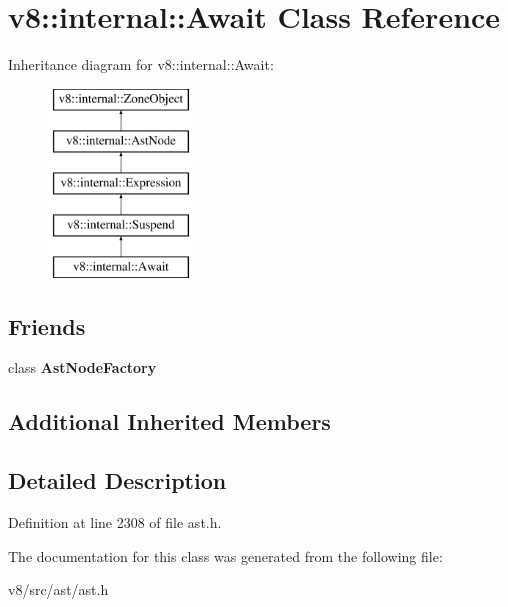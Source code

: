 \hypertarget{classv8_1_1internal_1_1Await}{}\section{v8\+:\+:internal\+:\+:Await Class Reference}
\label{classv8_1_1internal_1_1Await}
Inheritance diagram for v8\+:\+:internal\+:\+:Await\+:\begin{figure}[H]
\begin{center}
\leavevmode
\includegraphics[height=5.000000cm]{classv8_1_1internal_1_1Await}
\end{center}
\end{figure}
\subsection*{Friends}
\begin{DoxyCompactItemize}
\item 
\mbox{\label{classv8_1_1internal_1_1Await_a8d587c8ad3515ff6433eb83c578e795f}} 
class {\bfseries Ast\+Node\+Factory}
\end{DoxyCompactItemize}
\subsection*{Additional Inherited Members}


\subsection{Detailed Description}


Definition at line 2308 of file ast.\+h.



The documentation for this class was generated from the following file\+:\begin{DoxyCompactItemize}
\item 
v8/src/ast/ast.\+h\end{DoxyCompactItemize}
